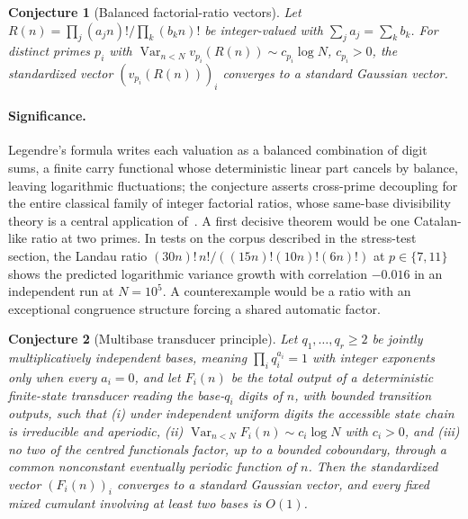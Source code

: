 \documentclass[11pt]{article}
\newtheorem{conjecture}{Conjecture}
\theoremstyle{definition}
\begin{document}
\begin{conjecture}[Balanced factorial-ratio vectors]\label{ab19}
Let $R(n)=\prod_j(a_jn)!\big/\prod_k(b_kn)!$ be integer-valued with $\sum_ja_j=\sum_kb_k$.  For distinct primes $p_i$ with $\operatorname{Var}_{n<N}v_{p_i}(R(n))\sim c_{p_i}\log N$, $c_{p_i}>0$, the standardized vector $(v_{p_i}(R(n)))_i$ converges to a standard Gaussian vector.
\end{conjecture}

\paragraph{Significance.}
Legendre's formula writes each valuation as a balanced combination of digit sums, a finite carry functional whose deterministic linear part cancels by balance, leaving logarithmic fluctuations; the conjecture asserts cross-prime decoupling for the entire classical family of integer factorial ratios, whose same-base divisibility theory is a central application of~\cite{DK19}.  A first decisive theorem would be one Catalan-like ratio at two primes.  In tests on the corpus described in the stress-test section, the Landau ratio $(30n)!\,n!/((15n)!(10n)!(6n)!)$ at $p\in\{7,11\}$ shows the predicted logarithmic variance growth with correlation $-0.016$ in an independent run at $N=10^5$.  A counterexample would be a ratio with an exceptional congruence structure forcing a shared automatic factor.

\begin{conjecture}[Multibase transducer principle]\label{ab20}
Let $q_1,\ldots,q_r\ge2$ be jointly multiplicatively independent bases, meaning $\prod_iq_i^{a_i}=1$ with integer exponents only when every $a_i=0$, and let $F_i(n)$ be the total output of a deterministic finite-state transducer reading the base-$q_i$ digits of $n$, with bounded transition outputs, such that (i) under independent uniform digits the accessible state chain is irreducible and aperiodic, (ii) $\operatorname{Var}_{n<N}F_i(n)\sim c_i\log N$ with $c_i>0$, and (iii) no two of the centred functionals factor, up to a bounded coboundary, through a common nonconstant eventually periodic function of $n$.  Then the standardized vector $(F_i(n))_i$ converges to a standard Gaussian vector, and every fixed mixed cumulant involving at least two bases is $O(1)$.
\end{conjecture}
\end{document}
